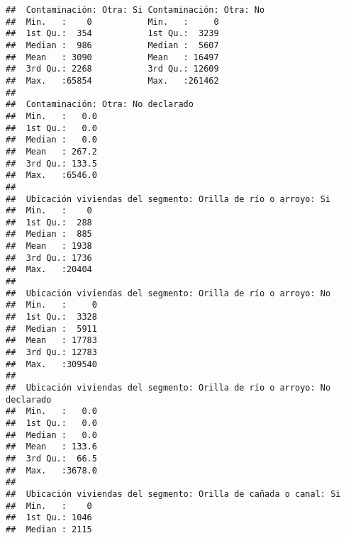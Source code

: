 \documentclass[11pt,]{article}
\begin{document}
\begin{verbatim}
##  Contaminación: Otra: Si Contaminación: Otra: No
##  Min.   :    0           Min.   :     0         
##  1st Qu.:  354           1st Qu.:  3239         
##  Median :  986           Median :  5607         
##  Mean   : 3090           Mean   : 16497         
##  3rd Qu.: 2268           3rd Qu.: 12609         
##  Max.   :65854           Max.   :261462         
##                                                 
##  Contaminación: Otra: No declarado
##  Min.   :   0.0                   
##  1st Qu.:   0.0                   
##  Median :   0.0                   
##  Mean   : 267.2                   
##  3rd Qu.: 133.5                   
##  Max.   :6546.0                   
##                                   
##  Ubicación viviendas del segmento: Orilla de río o arroyo: Si
##  Min.   :    0                                               
##  1st Qu.:  288                                               
##  Median :  885                                               
##  Mean   : 1938                                               
##  3rd Qu.: 1736                                               
##  Max.   :20404                                               
##                                                              
##  Ubicación viviendas del segmento: Orilla de río o arroyo: No
##  Min.   :     0                                              
##  1st Qu.:  3328                                              
##  Median :  5911                                              
##  Mean   : 17783                                              
##  3rd Qu.: 12783                                              
##  Max.   :309540                                              
##                                                              
##  Ubicación viviendas del segmento: Orilla de río o arroyo: No declarado
##  Min.   :   0.0                                                        
##  1st Qu.:   0.0                                                        
##  Median :   0.0                                                        
##  Mean   : 133.6                                                        
##  3rd Qu.:  66.5                                                        
##  Max.   :3678.0                                                        
##                                                                        
##  Ubicación viviendas del segmento: Orilla de cañada o canal: Si
##  Min.   :    0                                                 
##  1st Qu.: 1046                                                 
##  Median : 2115                                                 

\end{verbatim}
\end{document}
